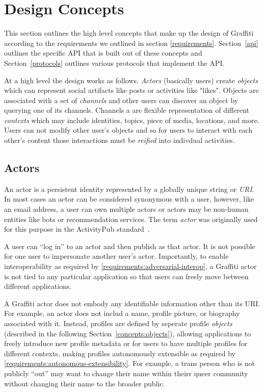 \section{Design Concepts}

This section outlines the high level concepts that make up the design of Graffiti
according to the requirements we outlined in section \ref{requirements}.
Section~\ref{api} outlines the specific API that is built out of these
concepts and Section~\ref{protocols} outlines various protocols that implement the API.

At a high level the design works as follows.
\emph{Actors} (basically users) create \emph{objects} which can represent
social artifacts like posts or activities like "likes".
Objects are associated with a set of \emph{channels} and other users can
discover an object by querying one of its channels. Channels a are flexible representation
of different \emph{contexts} which may include identities, topics, piece of media, locations,
and more.
Users can not modify other user's objects and so for users to interact with each other's content
those interactions must be \emph{reified} into indivdual
activities.

\subsection{Actors}

An actor is a persistent identity represented by a globally unique string or \emph{URI}.
In most cases an actor can be considered synonymous with a user,
however, like an email address, a user can own multiple actors
or actors may be non-human entities like bots or recommendation services.
The term \emph{actor} was originally used for this purpose
in the ActivityPub standard~\cite{activitypub}.

A user can ``log in'' to an actor and then publish as that actor.
It is not possible for one user to impersonate another user's actor.
Importantly, to enable interoperability
as required by \ref{requirements:adversarial-interop},
a Graffiti actor is not tied to any particular application so that users can freely move between
different applications.

A Graffiti actor does not embody any identifiable information other than its
URI. For example, an actor does not includ a
name, profile picture, or biography associated with it.
Instead, profiles are defined by seperate profile \emph{objects}
(described in the following Section~\ref{concepts:objects}),
allowing applications to freely introduce new profile
metadata or for users to have multiple profiles for different contexts,
making profiles autonomously extensible as required by \ref{requirements:autonomous-extensibility}.
For example, a trans person who is not publicly ``out'' may want to
change their name within theirr queer community without
changing their name to the broader public.

